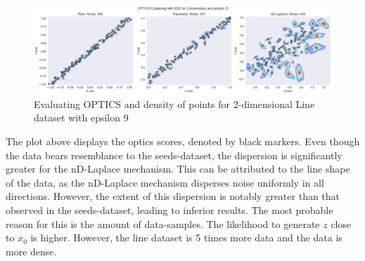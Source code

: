 \begin{figure}[H]
  \centering
  \includegraphics[width=1\linewidth]{Discussion/behaviour-2d-line-dataset&optics.png}
  \caption{Evaluating OPTICS and density of points for 2-dimensional Line dataset with epsilon 9}
  \label{fig:validation-Line-dataset_comparison_2d-laplace}
\end{figure}

The plot above displays the \gls{optics} scores, denoted by black markers. Even though the data bears resemblance to the seeds-dataset, the dispersion is significantly greater for the nD-Laplace mechanism. This can be attributed to the line shape of the data, as the nD-Laplace mechanism disperses noise uniformly in all directions. However, the extent of this dispersion is notably greater than that observed in the seeds-dataset, leading to inferior results.
The most probable reason for this is the amount of data-samples.
The likelihood to generate $z$ close to $x_0$ is higher. However, the line dataset is 5 times more data and the data is more dense.

